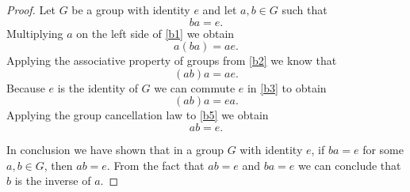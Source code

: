 \documentclass[11pt,a4paper]{article}
\begin{document}
\begin{proof}
Let $G$ be a group with identity $e$ and let $a,b \in G$ such that
\begin{equation}\label{b1}
ba = e.
\end{equation}
Multiplying $a$ on the left side of \eqref{b1} we obtain
\begin{equation}\label{b2}
a(ba) = ae.
\end{equation}
Applying the associative property of groups from \eqref{b2} we know that
\begin{equation}\label{b3}
(ab)a = ae.
\end{equation}
Because $e$ is the identity of $G$ we can commute $e$ in \eqref{b3} to obtain
\begin{equation}\label{b5}
(ab)a = ea.
\end{equation}
Applying the group cancellation law to \eqref{b5} we obtain
\begin{equation}
ab = e.
\end{equation}

In conclusion we have shown that in a group $G$ with identity $e$, if $ba = e$ for some $a, b \in G$, then $ab = e$. From the fact that $ab = e$ and $ba = e$ we can conclude that $b$ is the inverse of $a$.
\end{proof}
\end{document}
